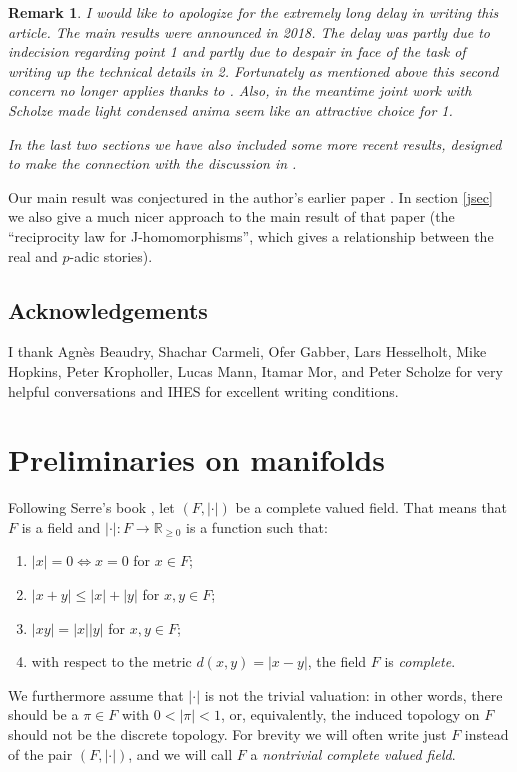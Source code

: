 \documentclass[12pt]{article}
\newtheorem{remark}[theorem]{Remark}
\begin{document}
\begin{remark}
I would like to apologize for the extremely long delay in writing this article.  The main results were announced in 2018.  The delay was partly due to indecision regarding point 1 and partly due to despair in face of the task of writing up the technical details in 2.  Fortunately as mentioned above this second concern no longer applies thanks to \cite{HeyerSixFunctors}.  Also, in the meantime joint work with Scholze made light condensed anima seem like an attractive choice for 1.

In the last two sections we have also included some more recent results, designed to make the connection with the discussion in \cite{BeaudryLinearization}.
\end{remark}

Our main result was conjectured in the author's earlier paper \cite{ClausenJ}.  In section \ref{jsec} we also give a much nicer approach to the main result of that paper (the ``reciprocity law for J-homomorphisms'', which gives a relationship between the real and $p$-adic stories).

\subsection*{Acknowledgements}

I thank Agnès Beaudry, Shachar Carmeli, Ofer Gabber, Lars Hesselholt, Mike Hopkins, Peter Kropholler, Lucas Mann, Itamar Mor, and Peter Scholze for very helpful conversations and IHES for excellent writing conditions.


\tableofcontents

\section{Preliminaries on manifolds}\label{mansec}

Following Serre's book \cite{SerreLie}, let $(F,|\cdot |)$ be a complete valued field.  That means that $F$ is a field and $|\cdot|:F\rightarrow\mathbb{R}_{\geq 0}$ is a function such that:
\begin{enumerate}
\item $|x|=0 \Leftrightarrow x=0$ for $x\in F$;
\item $|x+y|\leq |x|+|y|$ for $x,y\in F$;
\item $|xy|=|x||y|$ for $x,y\in F$;
\item with respect to the metric $d(x,y)=|x-y|$, the field $F$ is \emph{complete}.
\end{enumerate}
We furthermore assume that $|\cdot|$ is not the trivial valuation: in other words, there should be a $\pi\in F$ with $0<|\pi|<1$, or, equivalently, the induced topology on $F$ should not be the discrete topology.  For brevity we will often write just $F$ instead of the pair $(F,|\cdot |)$, and we will call $F$ a \emph{nontrivial complete valued field}.
\end{document}
